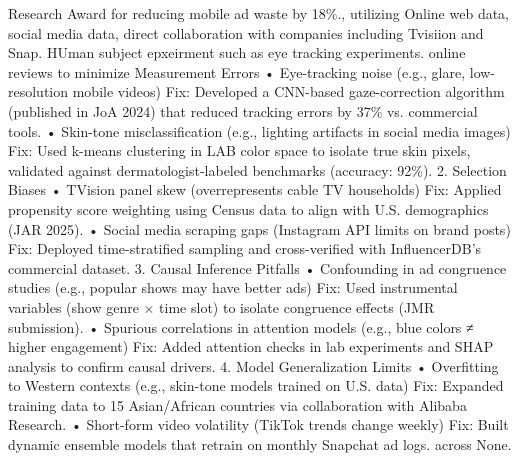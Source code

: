 \documentclass{article}
\begin{document}
Research Award for reducing mobile ad waste by 18\%., utilizing Online web data, social media data, direct collaboration with companies including Tvisiion and Snap. HUman subject epxeirment such as eye tracking experiments. online reviews to minimize Measurement Errors • Eye-tracking noise (e.g., glare, low-resolution mobile videos)  Fix: Developed a CNN-based gaze-correction algorithm (published in JoA 2024) that reduced tracking errors by 37\% vs. commercial tools.  • Skin-tone misclassification (e.g., lighting artifacts in social media images)  Fix: Used k-means clustering in LAB color space to isolate true skin pixels, validated against dermatologist-labeled benchmarks (accuracy: 92\%).  2. Selection Biases • TVision panel skew (overrepresents cable TV households)  Fix: Applied propensity score weighting using Census data to align with U.S. demographics (JAR 2025).  • Social media scraping gaps (Instagram API limits on brand posts)  Fix: Deployed time-stratified sampling and cross-verified with InfluencerDB’s commercial dataset.  3. Causal Inference Pitfalls • Confounding in ad congruence studies (e.g., popular shows may have better ads)  Fix: Used instrumental variables (show genre × time slot) to isolate congruence effects (JMR submission).  • Spurious correlations in attention models (e.g., blue colors ≠ higher engagement)  Fix: Added attention checks in lab experiments and SHAP analysis to confirm causal drivers.  4. Model Generalization Limits • Overfitting to Western contexts (e.g., skin-tone models trained on U.S. data)  Fix: Expanded training data to 15 Asian/African countries via collaboration with Alibaba Research.  • Short-form video volatility (TikTok trends change weekly)  Fix: Built dynamic ensemble models that retrain on monthly Snapchat ad logs. across None.
\end{document}
